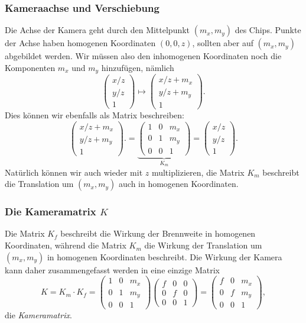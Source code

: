 \subsubsection{Kameraachse und Verschiebung}
Die Achse der Kamera geht durch den Mittelpunkt $(m_x,m_y)$ des Chips.
Punkte der Achse haben homogenen Koordinaten $(0,0,z)$, sollten aber
auf $(m_x,m_y)$ abgebildet werden.
Wir müssen also den inhomogenen Koordinaten noch die Komponenten
$m_x$ und $m_y$ hinzufügen, nämlich
\[
\begin{pmatrix} x/z \\ y/z \\ 1 \end{pmatrix}
\mapsto
\begin{pmatrix} x/z +m_x\\ y/z +m_y\\ 1 \end{pmatrix}.
\]
Dies können wir ebenfalls als Matrix beschreiben:
\[
\begin{pmatrix} x/z +m_x\\ y/z +m_y\\ 1 \end{pmatrix}.
=
\underbrace{
\begin{pmatrix}
1&0&m_x\\
0&1&m_y\\
0&0&1
\end{pmatrix}
}_{\displaystyle K_m}
=
\begin{pmatrix} x/z \\ y/z \\ 1 \end{pmatrix}.
\]
Natürlich können wir auch wieder mit $z$ multiplizieren, die Matrix
$K_m$ beschreibt die Translation um $(m_x,m_y)$ auch in homogenen
Koordinaten.

\subsubsection{Die Kameramatrix $K$}
Die Matrix $K_f$ beschreibt die Wirkung der Brennweite in homogenen
Koordinaten, während die Matrix $K_m$ die Wirkung der Translation um
$(m_x,m_y)$ in homogenen Koordinaten beschreibt.
Die Wirkung der Kamera kann daher zusammengefasst werden in eine einzige
Matrix
\[
K
=
K_m\cdot K_f
=
\begin{pmatrix}
1&0&m_x\\
0&1&m_y\\
0&0&1
\end{pmatrix}
\begin{pmatrix}
f&0&0\\
0&f&0\\
0&0&1
\end{pmatrix}
=
\begin{pmatrix}
f&0&m_x\\
0&f&m_y\\
0&0&1
\end{pmatrix},
\]
die {\em Kameramatrix}.
%

